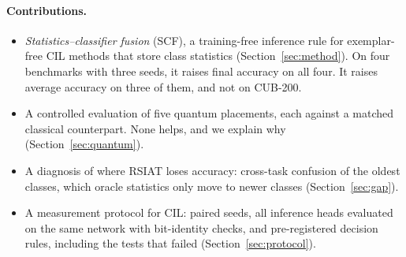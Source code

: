 \paragraph{Contributions.}
\begin{itemize}
  \item \emph{Statistics--classifier fusion} (SCF), a training-free inference
    rule for exemplar-free CIL methods that store class statistics
    (Section~\ref{sec:method}). On four benchmarks with three seeds, it
    raises final accuracy on all four. It raises average accuracy on three
    of them, and not on CUB-200.
  \item A controlled evaluation of five quantum placements, each against a
    matched classical counterpart. None helps, and we explain why
    (Section~\ref{sec:quantum}).
  \item A diagnosis of where RSIAT loses accuracy: cross-task confusion of
    the oldest classes, which oracle statistics only move to newer classes
    (Section~\ref{sec:gap}).
  \item A measurement protocol for CIL: paired seeds, all inference heads
    evaluated on the same network with bit-identity checks, and
    pre-registered decision rules, including the tests that failed
    (Section~\ref{sec:protocol}).
\end{itemize}
